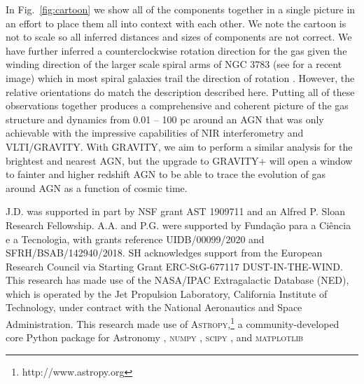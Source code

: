\documentclass[longauth,]{aa}
\begin{document}
In Fig.~\ref{fig:cartoon} we show all of the components together in a single picture in an effort to place them all into context with each other. We note the cartoon is not to scale so all inferred distances and sizes of components are not correct. We have further inferred a counterclockwise rotation direction for the gas given the winding direction of the larger scale spiral arms of NGC 3783 (see \citet{den-Brok:2020aa} for a recent image) which in most spiral galaxies trail the direction of rotation \citep[e.g.][]{Buta:2011aa}.  However, the relative orientations do match the description described here. Putting all of these observations together produces a comprehensive and coherent picture of the gas structure and dynamics from 0.01 -- 100 pc around an AGN that was only achievable with the impressive capabilities of NIR interferometry and VLTI/GRAVITY. With GRAVITY, we aim to perform a similar analysis for the brightest and nearest AGN, but the upgrade to GRAVITY+ will open a window to fainter and higher redshift AGN to be able to trace the evolution of gas around AGN as a function of cosmic time.

\begin{acknowledgements}
J.D. was supported in part by 
NSF grant AST 1909711 and an Alfred P. Sloan Research Fellowship.  A.A. and P.G. were supported by Funda\c{c}\~{a}o 
para a Ci\^{e}ncia e a Tecnologia, with grants reference UIDB/00099/2020 and 
SFRH/BSAB/142940/2018.  SH acknowledges support from the European 
Research Council via Starting Grant ERC-StG-677117 DUST-IN-THE-WIND. This research has made use 
of the NASA/IPAC Extragalactic Database (NED), which is operated by the Jet 
Propulsion Laboratory, California Institute of Technology, under contract with 
the National Aeronautics and Space Administration. This research made use of \textsc{Astropy},\footnote{http://www.astropy.org} a community-developed core Python package for Astronomy \citep{Astropy:2013ek,Astropy:2018dk}, \textsc{numpy} \citep{vanderWalt:2011we}, \textsc{scipy} \citep{Jones:2001ch}, and \textsc{matplotlib} \citep{Hunter:2007}
\end{acknowledgements}






\appendix
\end{document}
